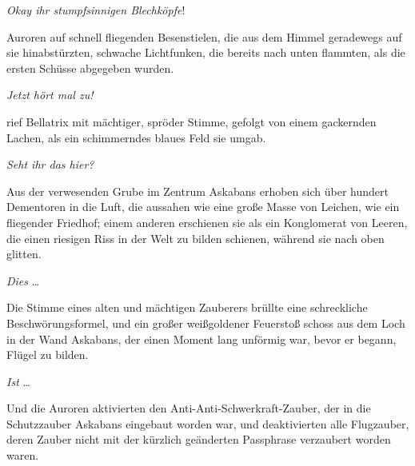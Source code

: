 \emph{Okay ihr stumpfsinnigen Blechköpfe}!

Auroren auf schnell fliegenden Besenstielen, die aus dem Himmel geradewegs auf sie hinabstürzten, schwache Lichtfunken, die bereits nach unten flammten, als die ersten Schüsse abgegeben wurden.

\emph{Jetzt hört mal zu!}

 rief Bellatrix mit mächtiger, spröder Stimme, gefolgt von einem gackernden Lachen, als ein schimmerndes blaues Feld sie umgab.

\emph{Seht ihr das hier?}

Aus der verwesenden Grube im Zentrum Askabans erhoben sich über hundert Dementoren in die Luft, die aussahen wie eine große Masse von Leichen, wie ein fliegender Friedhof; einem anderen erschienen sie als ein Konglomerat von Leeren, die einen riesigen Riss in der Welt zu bilden schienen, während sie nach oben glitten.

\emph{Dies} …

Die Stimme eines alten und mächtigen Zauberers brüllte eine schreckliche Beschwörungsformel, und ein großer weißgoldener Feuerstoß schoss aus dem Loch in der Wand Askabans, der einen Moment lang unförmig war, bevor er begann, Flügel zu bilden.

\emph{Ist} …

Und die Auroren aktivierten den Anti-Anti-Schwerkraft-Zauber, der in die Schutzzauber Askabans eingebaut worden war, und deaktivierten alle Flugzauber, deren Zauber nicht mit der kürzlich geänderten Passphrase verzaubert worden waren.

